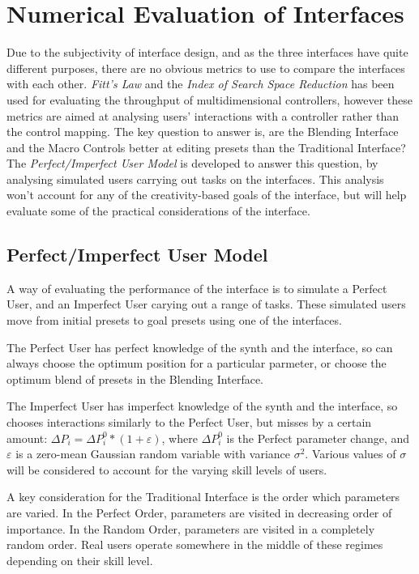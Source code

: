 \documentclass[11pt, oneside]{report}   	%
\begin{document}
\chapter{Numerical Evaluation of Interfaces}
Due to the subjectivity of interface design, and as the three interfaces have quite different purposes, there are no obvious metrics to use to compare the interfaces with each other. 
\emph{Fitt's Law} and the \emph{Index of Search Space Reduction} \cite{TubbThesis} has been used for evaluating the throughput of multidimensional controllers, however these metrics are aimed at analysing users' interactions with a controller rather than the control mapping. 
The key question to answer is, are the Blending Interface and the Macro Controls better at editing presets than the Traditional Interface?
The \emph{Perfect/Imperfect User Model}  is developed to answer this question, by analysing simulated users carrying out tasks on the interfaces. This analysis won't account for any of the creativity-based goals of the interface, but will help evaluate some of the practical considerations of the interface. 
\section{Perfect/Imperfect User Model}
A way of evaluating the performance of the interface is to simulate a Perfect User, and an Imperfect User carying out a range of tasks. These simulated users move from initial presets to goal presets using one of the interfaces. 
 
The Perfect User has perfect knowledge of the synth and the interface, so can always choose the optimum position for a particular parmeter, or choose the optimum blend of presets in the Blending Interface.

The Imperfect User has imperfect knowledge of the synth and the interface, so chooses interactions similarly to the Perfect User, but misses by a certain amount: $\Delta P_i = \Delta P_i^0 * (1 + \varepsilon)$, where $\Delta P_i^0$ is the Perfect parameter change, and $\varepsilon$ is a zero-mean Gaussian random variable with variance $\sigma^2$. Various values of $\sigma$ will be considered to account for the varying skill levels of users.

A key consideration for the Traditional Interface is the order which parameters are varied. In the Perfect Order, parameters are visited in decreasing order of importance. In the Random Order, parameters are visited in a completely random order. Real users operate somewhere in the middle of these regimes depending on their skill level. 
\vspace{-10pt}
\end{document}
